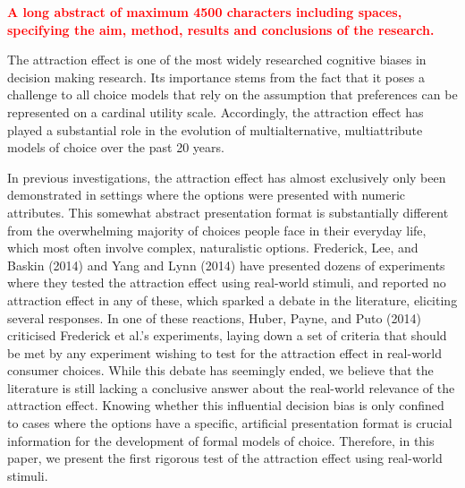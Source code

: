 \documentclass[12pt, a4paper]{article}
\begin{document}
\textcolor{red}{\textbf{A long abstract of maximum 4500 characters including spaces, specifying the aim, method, results and conclusions of the research.}}

The attraction effect is one of the most widely researched cognitive biases in decision making research. Its importance stems from the fact that it poses a challenge to all choice models that rely on the assumption that preferences can be represented on a cardinal utility scale. Accordingly, the attraction effect has played a substantial role in the evolution of multialternative, multiattribute models of choice over the past 20 years.



In previous investigations, the attraction effect has almost exclusively only been demonstrated in settings where the options were presented with numeric attributes. This somewhat abstract presentation format is substantially different from the overwhelming majority of choices people face in their everyday life, which most often involve complex, naturalistic options. Frederick, Lee, and Baskin (2014) and Yang and Lynn (2014) have presented dozens of experiments where they tested the attraction effect using real-world stimuli, and reported no attraction effect in any of these, which sparked a debate in the literature, eliciting several responses. In one of these reactions, Huber, Payne, and Puto (2014) criticised Frederick et al.’s experiments, laying down a set of criteria that should be met by any experiment wishing to test for the attraction effect in real-world consumer choices. While this debate has seemingly ended, we believe that the literature is still lacking a conclusive answer about the real-world relevance of the attraction effect. Knowing whether this influential decision bias is only confined to cases where the options have a specific, artificial presentation format is crucial information for the development of formal models of choice. Therefore, in this paper, we present the first rigorous test of the attraction effect using real-world stimuli.
\end{document}
